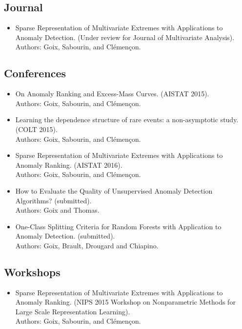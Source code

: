 \begin{listpublis}

\subsection*{Journal}
\begin{itemize}
\item Sparse Representation of Multivariate Extremes with Applications to Anomaly Detection. (Under review for Journal of Multivariate Analysis).\\
Authors: Goix, Sabourin, and Clémençon.
\end{itemize}

\subsection*{Conferences}
\begin{itemize}
\item On Anomaly Ranking and Excess-Mass Curves. (AISTAT 2015).\\
Authors: Goix, Sabourin, and Clémençon. 

\item Learning the dependence structure of rare events: a non-asymptotic study. (COLT 2015).\\
Authors: Goix, Sabourin, and Clémençon.

\item Sparse Representation of Multivariate Extremes with Applications to Anomaly Ranking. (AISTAT 2016).\\
Authors: Goix, Sabourin, and Clémençon.

\item How to Evaluate the Quality of Unsupervised Anomaly Detection Algorithms? (submitted).\\ Authors: Goix and Thomas. 

\item One-Class Splitting Criteria for Random Forests with Application to Anomaly Detection. (submitted).\\
Authors: Goix, Brault, Drougard and Chiapino.
\end{itemize}


\subsection*{Workshops}
\begin{itemize}
\item Sparse Representation of Multivariate Extremes with Applications to Anomaly Ranking. (NIPS 2015 Workshop on Nonparametric Methods for Large Scale Representation Learning).\\
Authors: Goix, Sabourin, and Clémençon.


\end{itemize}
\end{listpublis}
